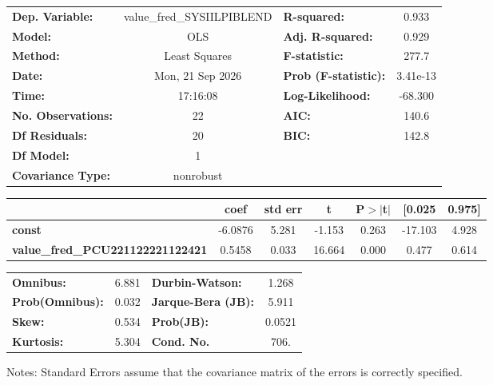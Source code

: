 \begin{center}
\begin{tabular}{lclc}
\toprule
\textbf{Dep. Variable:}                  & value\_fred\_SYSIILPIBLEND & \textbf{  R-squared:         } &     0.933   \\
\textbf{Model:}                          &            OLS             & \textbf{  Adj. R-squared:    } &     0.929   \\
\textbf{Method:}                         &       Least Squares        & \textbf{  F-statistic:       } &     277.7   \\
\textbf{Date:}                           &      Mon, 21 Sep 2026      & \textbf{  Prob (F-statistic):} &  3.41e-13   \\
\textbf{Time:}                           &          17:16:08          & \textbf{  Log-Likelihood:    } &   -68.300   \\
\textbf{No. Observations:}               &               22           & \textbf{  AIC:               } &     140.6   \\
\textbf{Df Residuals:}                   &               20           & \textbf{  BIC:               } &     142.8   \\
\textbf{Df Model:}                       &                1           & \textbf{                     } &             \\
\textbf{Covariance Type:}                &         nonrobust          & \textbf{                     } &             \\
\bottomrule
\end{tabular}
\begin{tabular}{lcccccc}
                                         & \textbf{coef} & \textbf{std err} & \textbf{t} & \textbf{P$> |$t$|$} & \textbf{[0.025} & \textbf{0.975]}  \\
\midrule
\textbf{const}                           &      -6.0876  &        5.281     &    -1.153  &         0.263        &      -17.103    &        4.928     \\
\textbf{value\_fred\_PCU221122221122421} &       0.5458  &        0.033     &    16.664  &         0.000        &        0.477    &        0.614     \\
\bottomrule
\end{tabular}
\begin{tabular}{lclc}
\textbf{Omnibus:}       &  6.881 & \textbf{  Durbin-Watson:     } &    1.268  \\
\textbf{Prob(Omnibus):} &  0.032 & \textbf{  Jarque-Bera (JB):  } &    5.911  \\
\textbf{Skew:}          &  0.534 & \textbf{  Prob(JB):          } &   0.0521  \\
\textbf{Kurtosis:}      &  5.304 & \textbf{  Cond. No.          } &     706.  \\
\bottomrule
\end{tabular}
\end{center}

Notes: \newline
 [1] Standard Errors assume that the covariance matrix of the errors is correctly specified.